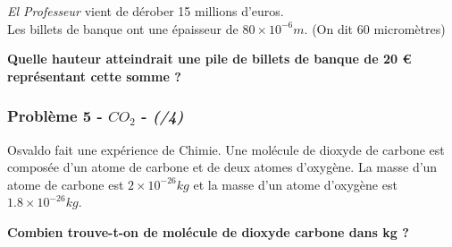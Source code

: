 \textit{\og El Professeur \fg{} } vient de dérober 15 millions d’euros. \\
Les billets de banque ont une épaisseur de $80 \times 10^{-6} m$. (On dit 60 micromètres)

\textbf{Quelle hauteur atteindrait une pile de billets de banque de 20 \euro{} représentant cette somme ?}

\Pointilles[5]

\subsubsection*{Problème 5 - $CO_2$  - \textit{(/4)}}

Osvaldo fait une expérience de Chimie. Une molécule de dioxyde de carbone est composée d'un atome de carbone et de deux atomes d'oxygène. La masse d'un atome de carbone est $2 \times 10^{-26}kg$ et la masse d'un atome d'oxygène est $1.8 \times 10^{-26}kg$. 

\textbf{Combien trouve-t-on de molécule de dioxyde carbone dans kg ?}

\Pointilles[5]

